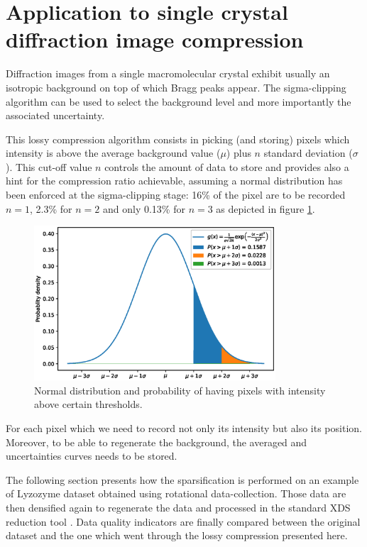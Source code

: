 \documentclass[preprint]{iucr}              %
\begin{document}
\section{Application to single crystal diffraction image compression}
Diffraction images from a single macromolecular crystal exhibit usually an isotropic background on top of which Bragg peaks appear.
The sigma-clipping algorithm can be used to select the background level and more importantly the associated uncertainty.

This lossy compression algorithm consists in picking (and storing) pixels which intensity is above the average background value ($\mu$) plus $n$ standard deviation ($\sigma$). 
This cut-off value $n$ controls the amount of data to store and provides also a hint for the compression ratio achievable, assuming a normal distribution has been enforced at the sigma-clipping stage: 16\% of the pixel are to be recorded $n=1$,  2.3\% for $n=2$ and only 0.13\% for $n=3$ as depicted in figure \ref{distribution}.
\begin{figure}
\label{distribution}
\begin{center}
\includegraphics[width=9cm]{distribution}
\caption{Normal distribution and probability of having pixels with intensity above certain thresholds.}
\end{center}
\end{figure}

For each pixel which  we need to record not only its intensity but also its position. 
Moreover, to be able to regenerate the background, the averaged and uncertainties curves needs to be stored.

The following section presents how the sparsification is performed on an example of Lyzozyme dataset obtained using rotational data-collection.
Those data are then densified again to regenerate the data and processed in the standard XDS reduction tool \cite{xds}.
Data quality indicators are finally compared between the original dataset and the one which went through the lossy compression presented here.
\end{document}
